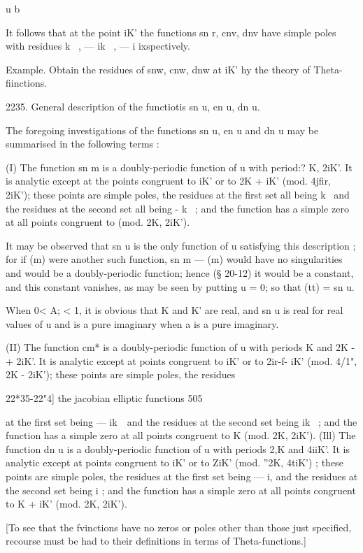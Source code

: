 u b   

It follows that at the point iK' the functions sn r, cnv, dnv have simple 
poles with residues k~ , — ik~ , — i ixspectively. 

Example. Obtain the residues of snw, cnw, dnw at iK' hy the theory of Theta- 
fiinctions. 

2235. General description of the functiotis sn u, en u, dn u. 

The foregoing investigations of the functions sn u, en u and dn u may be 
summarised in the following terms : 

(I) The function sn m is a doubly-periodic function of u with period:? 
 K, 2iK'. It is analytic except at the points congruent to iK' or to 2K + iK' 
(mod. 4jfir, 2iK'); these points are simple poles, the residues at the first set all 
being k~  and the residues at the second set all being - k~  ; and the function 
has a simple zero at all points congruent to (mod. 2K, 2iK'). 

It may be observed that sn u is the only function of u satisfying this description ; for 
if (m) were another such function, sn m — (m) would have no singularities and would be 
a doubly-periodic function; hence (§ 20-12) it would be a constant, and this constant 
vanishes, as may be seen by putting u = 0; so that   (tt) = sn u. 

When 0< A; < 1, it is obvious that K and K' are real, and sn u is real for 
real values of u and is a pure imaginary when a is a pure imaginary. 

(II) The function cm* is a doubly-periodic function of u with periods 
 K and 2K -+ 2iK'. It is analytic except at points congruent to iK' or to 
2ir-f- iK' (mod. 4/1", 2K -  2iK'); these points are simple poles, the residues 



22*35-22"4] the jacobian elliptic functions 505 

at the first set being — ik~\ and the residues at the second set being ik~  ; 
and the function has a simple zero at all points congruent to K (mod. 2K, 2iK'). 
(Ill) The function dn u is a doubly-periodic function of u with periods 
2,K and 4iiK'. It is analytic except at points congruent to iK' or to ZiK' 
(mod. ''2K, 4tiK') ; these points are simple poles, the residues at the first set 
being — i, and the residues at the second set being i ; and the function has 
a simple zero at all points congruent to K + iK' (mod. 2K, 2iK'). 

[To see that the fvinctions have no zeros or poles other than those just specified, 
recourse must be had to their definitions in terms of Theta-functions.] 


